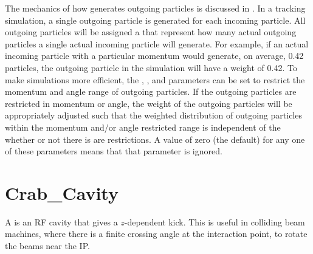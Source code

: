 The mechanics of how \bmad generates outgoing particles is discussed in .
In a tracking simulation, a single outgoing particle is generated for each incoming particle.  All
outgoing particles will be assigned a  that represent how many actual outgoing particles
a single actual incoming particle will generate. For example, if an actual incoming particle with a
particular momentum would generate, on average, 0.42 particles, the outgoing particle in the
simulation will have a weight of 0.42.  To make simulations more efficient, the ,
, and  parameters can be set to restrict the momentum and angle
range of outgoing particles. If the outgoing particles are restricted in momentum or angle, the
weight of the outgoing particles will be appropriately adjusted such that the weighted distribution
of outgoing particles within the momentum and/or angle restricted range is independent of the
whether or not there is are restrictions.  A value of zero (the default) for any one of these
parameters means that that parameter is ignored.

\newpage

\section{Crab_Cavity}
\label{s:crab}

A  is an RF cavity that gives a $z$-dependent kick. This is useful in colliding beam
machines, where there is a finite crossing angle at the interaction point, to rotate the beams near the IP.


